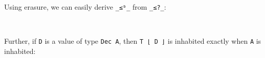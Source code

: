 Using erasure, we can easily derive \texttt{\_≤ᵇ\_} from
\texttt{\_≤?\_}:

\begin{fence}
\begin{code}%
\>[0]\AgdaSpace{}%
\AgdaSymbol{:}\AgdaSpace{}%
\AgdaSpace{}%
\AgdaSpace{}%
\AgdaSpace{}%
\AgdaSpace{}%
\<%
\\
\>[0]\AgdaSpace{}%
\AgdaSpace{}%
%
\>[9]\AgdaSymbol{=}%
\>[12]\AgdaSpace{}%
\AgdaSpace{}%
\AgdaSpace{}%
\AgdaSpace{}%
\<%
\end{code}
\end{fence}

Further, if \texttt{D} is a value of type \texttt{Dec\ A}, then
\texttt{T\ ⌊\ D\ ⌋} is inhabited exactly when \texttt{A} is inhabited:


